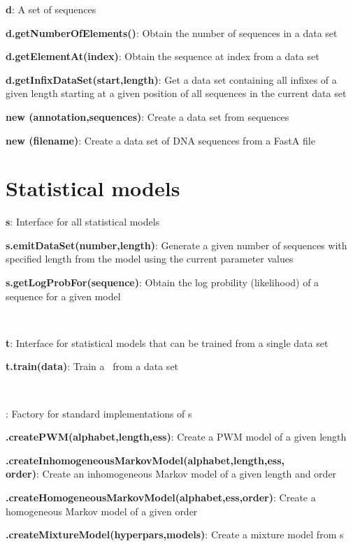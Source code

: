 \documentclass[10pt]{scrartcl}
\newcommand{\entry}[3]{{\bfseries #1#2}: #3}
\begin{document}
\begin{flushleft}
\entry{\DataSet}{ d}{A set of sequences}

\entry{d}{.getNumberOfElements()}{Obtain the number of sequences in a data set}

\entry{d}{.getElementAt(index)}{Obtain the sequence at index from a data set}

\entry{d}{.getInfixDataSet(start,length)}{Get a data set containing all infixes of a given length starting at a given position of all sequences in the current data set}

\entry{new \DataSet}{(annotation,sequences)}{Create a data set from sequences}

\entry{new \DNADataSet}{(filename)}{Create a data set of DNA sequences from a FastA file}

\section{Statistical models}

\entry{\StatMod}{ s}{Interface for all statistical models}

\entry{s}{.emitDataSet(number,length)}{Generate a given number of sequences with specified length from the model using the current parameter values}

\entry{s}{.getLogProbFor(sequence)}{Obtain the log probility (likelihood) of a sequence for a given model}

~

\entry{\TrainSM}{ t}{Interface for statistical models that can be trained from a single data set}

\entry{t}{.train(data)}{Train a \TrainSM~from a data set}

~

%
\entry{\TrainSMFactory}{}{Factory for standard implementations of \TrainSM s}

\entry{\TrainSMFactory}{.createPWM(alphabet,length,ess)}{Create a PWM model of a given length}

\entry{\TrainSMFactory}{.createInhomogeneousMarkovModel(alphabet,length,ess,\\order)}{Create an inhomogeneous Markov model of a given length and order}

\entry{\TrainSMFactory}{.createHomogeneousMarkovModel(alphabet,ess,order)}{Create a homogeneous Markov model of a given order}

\entry{\TrainSMFactory}{.createMixtureModel(hyperpars,models)}{Create a mixture model from \TrainSM s}


\end{flushleft}
\end{document}
